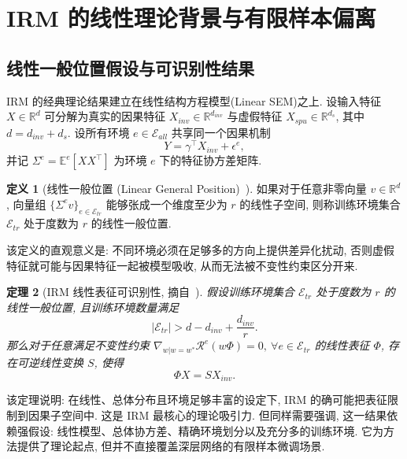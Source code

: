\documentclass[a4paper,punct=banjiao,twoside]{ctexrep}
\theoremstyle{plain}
\newtheorem{thm}{定理}[chapter]
\theoremstyle{definition}
\newtheorem{defn}[thm]{定义}
\theoremstyle{remark}
\begin{document}
\section{IRM 的线性理论背景与有限样本偏离}

\subsection{线性一般位置假设与可识别性结果}

IRM 的经典理论结果建立在线性结构方程模型(Linear SEM)之上. 设输入特征 $X \in \mathbb{R}^d$ 可分解为真实的因果特征 $X_{inv} \in \mathbb{R}^{d_{inv}}$ 与虚假特征 $X_{spu} \in \mathbb{R}^{d_s}$, 其中 $d=d_{inv}+d_s$. 设所有环境 $e \in \mathcal{E}_{all}$ 共享同一个因果机制
\begin{equation}
    Y = \gamma^\top X_{inv} + \epsilon^e,
\end{equation}
并记 $\Sigma^e = \mathbb{E}^e[XX^\top]$ 为环境 $e$ 下的特征协方差矩阵.

\begin{defn}[线性一般位置 (Linear General Position)~\cite{arjovsky2019invariant}]
\label{def:general_position}
如果对于任意非零向量 $v \in \mathbb{R}^d$, 向量组 $\{ \Sigma^e v \}_{e \in \mathcal{E}_{tr}}$ 能够张成一个维度至少为 $r$ 的线性子空间, 则称训练环境集合 $\mathcal{E}_{tr}$ 处于度数为 $r$ 的线性一般位置.
\end{defn}

该定义的直观意义是: 不同环境必须在足够多的方向上提供差异化扰动, 否则虚假特征就可能与因果特征一起被模型吸收, 从而无法被不变性约束区分开来.

\begin{thm}[IRM 线性表征可识别性, 摘自~\cite{arjovsky2019invariant}]
\label{thm:irm_thm9}
假设训练环境集合 $\mathcal{E}_{tr}$ 处于度数为 $r$ 的线性一般位置, 且训练环境数量满足
\begin{equation}
    |\mathcal{E}_{tr}| > d - d_{inv} + \frac{d_{inv}}{r}.
\end{equation}
那么对于任意满足不变性约束 $\nabla_{w|w=w^*}\mathcal{R}^e(w\Phi)=0,\ \forall e\in\mathcal{E}_{tr}$ 的线性表征 $\Phi$, 存在可逆线性变换 $S$, 使得
\begin{equation}
    \Phi X = S X_{inv}.
\end{equation}
\end{thm}

该定理说明: 在线性、总体分布且环境足够丰富的设定下, IRM 的确可能把表征限制到因果子空间中. 这是 IRM 最核心的理论吸引力. 但同样需要强调, 这一结果依赖强假设: 线性模型、总体协方差、精确环境划分以及充分多的训练环境. 它为方法提供了理论起点, 但并不直接覆盖深层网络的有限样本微调场景.
\end{document}
